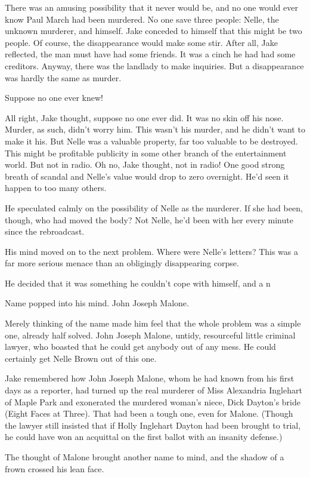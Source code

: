 \documentclass{novel}
\begin{document}
There was an amusing possibility that it never would be, and no one would ever know Paul March had been murdered. No one save three people: Nelle, the unknown murderer, and himself. Jake conceded to himself that this might be two people. Of course, the disappearance would make some stir. After all, Jake reflected, the man must have had some friends. It was a cinch he had had some creditors. Anyway, there was the landlady to make inquiries. But a disappearance was hardly the same as murder.

Suppose no one ever knew!

All right, Jake thought, suppose no one ever did. It was no skin off his nose. Murder, as such, didn’t worry him. This wasn’t his murder, and he didn’t want to make it his. But Nelle was a valuable property, far too valuable to be destroyed. This might be profitable publicity in some other branch of the entertainment world. But not in radio. Oh no, Jake thought, not in radio! One good strong breath of scandal and Nelle’s value would drop to zero overnight. He’d seen it happen to too many others.

He speculated calmly on the possibility of Nelle as the murderer. If she had been, though, who had moved the body? Not Nelle, he’d been with her every minute since the rebroadcast.

His mind moved on to the next problem. Where were Nelle’s letters? This was a far more serious menace than an obligingly disappearing corpse.

He decided that it was something he couldn’t cope with himself, and a n

Name popped into his mind. John Joseph Malone.

Merely thinking of the name made him feel that the whole problem was a simple one, already half solved. John Joseph Malone, untidy, resourceful little criminal lawyer, who boasted that he could get anybody out of any mess. He could certainly get Nelle Brown out of this one.

Jake remembered how John Joseph Malone, whom he had known from his first days as a reporter, had turned up the real murderer of Miss Alexandria Inglehart of Maple Park and exonerated the murdered woman’s niece, Dick Dayton’s bride (Eight Faces at Three). That had been a tough one, even for Malone. (Though the lawyer still insisted that if Holly Inglehart Dayton had been brought to trial, he could have won an acquittal on the first ballot with an insanity defense.)

The thought of Malone brought another name to mind, and the shadow of a frown crossed his lean face.
\end{document}

